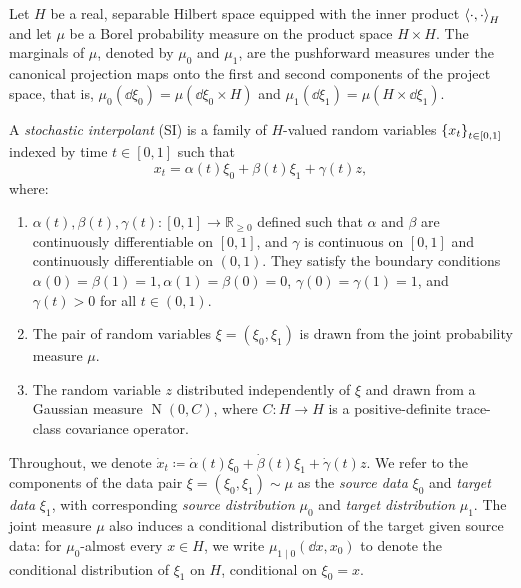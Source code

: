 Let \(H\) be a real, separable Hilbert space equipped with the inner product \(\ev{\cdot, \cdot}_{H}\) and let \(\mu\) be a Borel probability measure on the product space \(H \times H\). The marginals of \(\mu\), denoted by \(\mu_{0}\) and \(\mu_{1}\), are the pushforward measures under the canonical projection maps onto the first and second components of the project space, that is, \(\mu_{0}(\dd{\xi_{0}}) = \mu(\dd{\xi_{0}}\times H)\) and \(\mu_{1}(\dd{\xi_{1}}) = \mu(H \times \dd{\xi_{1}})\).


\begin{definition}\label{dfn:stochint}
  A \textit{stochastic interpolant} (SI) is a family of \(H\)-valued random variables \(\qty{x_{t}}_{t \in [0, 1]}\) indexed by time \(t \in [0, 1]\) such that
  \[
    x_{t} = \alpha(t) \xi_{0} + \beta(t) \xi_{1} + \gamma(t)z,
  \]
  where:
  \begin{enumerate}
    \item \(\alpha(t), \beta(t), \gamma(t) : [0, 1] \to \mathbb{R}_{\geq 0}\) defined such that \(\alpha\) and \(\beta\) are continuously differentiable on \([0, 1]\), and \(\gamma\)  is continuous on \([0, 1]\) and continuously differentiable on \((0, 1)\). They satisfy the boundary conditions \(\alpha(0) = \beta(1) = 1, \alpha(1) = \beta(0) = 0\), \(\gamma(0) = \gamma(1) = 1\), and \(\gamma(t) > 0\) for all \(t \in (0, 1)\).
    \item The pair of random variables \(\xi = (\xi_0, \xi_1)\) is drawn from the joint probability measure \(\mu\).
    \item The random variable \(z\) distributed independently of \(\xi\) and drawn from a Gaussian measure \(\operatorname{N}(0, C)\), where \(C : H\to H\) is a positive-definite trace-class covariance operator.
  \end{enumerate}
\end{definition}

Throughout, we denote \(\dot{x}_{t}\coloneqq \dot{\alpha}(t) \xi_{0} + \dot{\beta}(t) \xi_{1} + \dot{\gamma}(t) z\). We refer to the components of the data pair \(\xi = (\xi_{0}, \xi_{1}) \sim \mu\) as the \textit{source data} \(\xi_{0}\) and \textit{target data} \(\xi_{1}\), with corresponding \textit{source distribution} \(\mu_{0}\) and \textit{target distribution} \(\mu_{1}\). The joint measure \(\mu\) also induces a conditional distribution of the target given source data: for \(\mu_{0}\)-almost every \(x \in H\), we write \(\mu_{1 \mid 0}(\dd{x}, x_{0})\) to denote the  conditional distribution of \(\xi_{1}\) on \(H\), conditional on \(\xi_{0} = x\).

